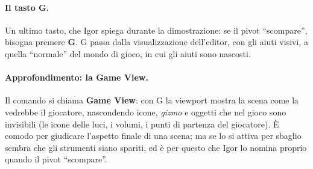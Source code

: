 \paragraph{Il tasto G.} Un ultimo tasto, che Igor spiega durante la dimostrazione: se il
pivot ``scompare'', bisogna premere \textbf{G}. G passa dalla visualizzazione
dell'editor, con gli aiuti visivi, a quella ``normale'' del mondo di gioco, in cui gli
aiuti sono nascosti.

\paragraph{Approfondimento: la Game View.} Il comando si chiama \textbf{Game View}: con G
la viewport mostra la scena come la vedrebbe il giocatore, nascondendo icone,
\emph{gizmo} e oggetti che nel gioco sono invisibili (le icone delle luci, i volumi, i
punti di partenza del giocatore). È comodo per giudicare l'aspetto finale di una scena;
ma se lo si attiva per sbaglio sembra che gli strumenti siano spariti, ed è per questo
che Igor lo nomina proprio quando il pivot ``scompare''.

